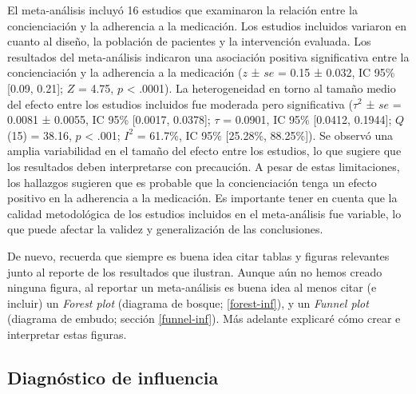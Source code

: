 \documentclass[
  bookmarksnumbered]{article}
\begin{document}
\begin{tcolorbox}[enhanced,attach boxed title to top center={yshift=-3mm,yshifttext=-1mm},
  colback=iacol!5!white,colframe=iacol!75!white,colbacktitle=iacol,
  title=Ejemplo de reporte con intervalos de confianza para heterogeneidad,fonttitle=\bfseries,
  boxed title style={size=small,colframe=iacol} ]
  
El meta-análisis incluyó 16 estudios que examinaron la relación entre la concienciación y la adherencia a la medicación. Los estudios incluidos variaron en cuanto al diseño, la población de pacientes y la intervención evaluada. Los resultados del meta-análisis indicaron una asociación positiva significativa entre la concienciación y la adherencia a la medicación ($z$ ± $se$ = 0.15 ± 0.032, IC 95\% [0.09, 0.21]; $Z$ = 4.75, $p$ < .0001). La heterogeneidad en torno al tamaño medio del efecto entre los estudios incluidos fue moderada pero significativa ($\tau^2$ ± $se$ =  0.0081 ± 0.0055, IC 95\% [0.0017, 0.0378]; $\tau$ = 0.0901, IC 95\% [0.0412, 0.1944]; $Q$(15) =  38.16, $p$ < .001; $I^2$ = 61.7\%, IC 95\% [25.28\%, 88.25\%]). Se observó una amplia variabilidad en el tamaño del efecto entre los estudios, lo que sugiere que los resultados deben interpretarse con precaución. A pesar de estas limitaciones, los hallazgos sugieren que es probable que la concienciación tenga un efecto positivo en la adherencia a la medicación. Es importante tener en cuenta que la calidad metodológica de los estudios incluidos en el meta-análisis fue variable, lo que puede afectar la validez y generalización de las conclusiones.

\end{tcolorbox}

De nuevo, recuerda que siempre es buena idea citar tablas y figuras relevantes junto al reporte de los resultados que ilustran. Aunque aún no hemos creado ninguna figura, al reportar un meta-análisis es buena idea al menos citar (e incluir) un \emph{Forest plot} (diagrama de bosque; \ref{forest-inf}), y un \emph{Funnel plot} (diagrama de embudo; sección \ref{funnel-inf}). Más adelante explicaré cómo crear e interpretar estas figuras.

\hypertarget{diag-inf}{%
\subsection{Diagnóstico de influencia}\label{diag-inf}}
\end{document}
